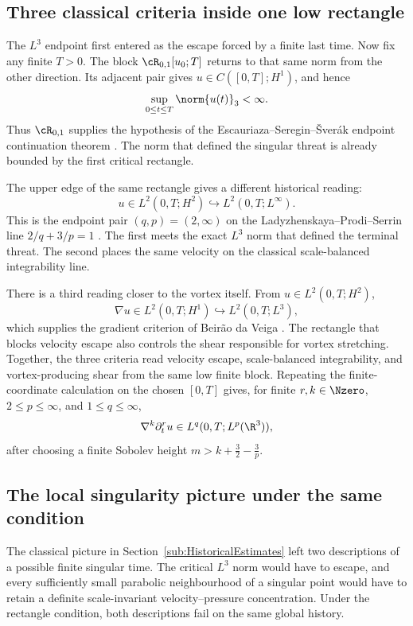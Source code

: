 \subsection{Three classical criteria inside one low rectangle}\label{sub:ClassicalCriteriaInsideFiniteRectangles}

The \(L^3\) endpoint first entered as the escape forced by a finite last time.  Now fix
any finite \(T>0\).  The block \(\cR_{0,1}[u_0;T]\) returns to that same norm from the
other direction.  Its adjacent pair gives \(u\in C([0,T];H^1)\), and hence
\[
  \sup_{0\leq t\leq T}\norm{u(t)}_3<\infty.
\]
Thus \(\cR_{0,1}\) supplies the hypothesis of the Escauriaza--Seregin--\v{S}ver\'ak endpoint continuation theorem \parencite{EscauriazaSereginSverak2003}.
The norm that defined the singular threat is already bounded by the first critical rectangle.

The upper edge of the same rectangle gives a different historical reading:
\[
  u\in L^2(0,T;H^2)
  \hookrightarrow L^2(0,T;L^\infty).
\]
This is the endpoint pair \((q,p)=(2,\infty)\) on the Ladyzhenskaya--Prodi--Serrin line \(2/q+3/p=1\) \parencite{Prodi1959,Serrin1962,Serrin1963,Ladyzhenskaya1967}.
The first meets the exact \(L^3\) norm that defined the terminal threat.  The second
places the same velocity on the classical scale-balanced integrability line.

There is a third reading closer to the vortex itself.  From
\(u\in L^2(0,T;H^2)\),
\[
  \nabla u\in L^2(0,T;H^1)
  \hookrightarrow L^2(0,T;L^3),
\]
which supplies the gradient criterion of Beir\~ao da Veiga
\parencite{BeiraoDaVeiga1995}.  The rectangle that blocks velocity escape also
controls the shear responsible for vortex stretching.  Together, the three criteria
read velocity escape, scale-balanced integrability, and vortex-producing shear from the
same low finite block.  Repeating the finite-coordinate calculation on the chosen
\([0,T]\) gives, for finite \(r,k\in\Nzero\), \(2\leq p\leq\infty\), and
\(1\leq q\leq\infty\),
\[
  \nabla^k\partial_t^ru\in L^q(0,T;L^p(\R^3)),
\]
after choosing a finite Sobolev height
\(m>k+\tfrac32-\tfrac3p\).

\subsection{The local singularity picture under the same condition}\label{sub:TheLocalSingularityPictureCloses}

The classical picture in Section~\ref{sub:HistoricalEstimates} left two descriptions of a possible finite singular time.
The critical \(L^3\) norm would have to escape, and every sufficiently small parabolic neighbourhood of a singular point would have to retain a definite scale-invariant velocity--pressure concentration.
Under the rectangle condition, both descriptions fail on the same global history.

